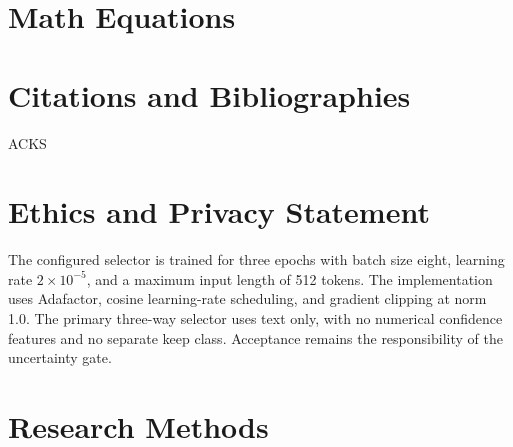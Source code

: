\documentclass[sigconf]{acmart}
\begin{document}
\section{Math Equations}




\section{Citations and Bibliographies}




\begin{acks}
ACKS
\end{acks}


\section*{Ethics and Privacy Statement}






\appendix
The configured selector is trained for three epochs with batch size eight, learning rate $2\times10^{-5}$, and a maximum input length of 512 tokens. The implementation uses Adafactor, cosine learning-rate scheduling, and gradient clipping at norm 1.0. The primary three-way selector uses text only, with no numerical confidence features and no separate keep class. Acceptance remains the responsibility of the uncertainty gate.
\section{Research Methods}
\end{document}
